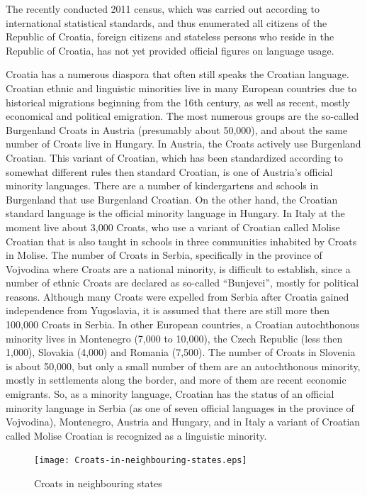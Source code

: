\begin{multicols}{2}
The recently conducted 2011 census, which was carried out according to international statistical standards, and thus enumerated all citizens of the Republic of Croatia, foreign citizens and stateless persons who reside in the Republic of Croatia, has not yet provided official figures on language usage.

Croatia has a numerous diaspora that often still speaks the Croatian language. Croatian ethnic and linguistic minorities live in many European countries due to historical migrations beginning from the 16th century, as well as recent, mostly economical and political emigration. The most numerous groups are the so-called Burgenland Croats in Austria (presumably about 50,000), and about the same number of Croats live in Hungary. In Austria, the Croats actively use Burgenland Croatian. This variant of Croatian, which has been standardized according to somewhat different rules then standard Croatian, is one of Austria’s official minority languages. There are a number of kindergartens and schools in Burgenland that use Burgenland Croatian. On the other hand, the Croatian standard language is the official minority language in Hungary. In Italy at the moment live about 3,000 Croats, who use a variant of Croatian called Molise Croatian that is also taught in schools in three communities inhabited by Croats in Molise. The number of Croats in Serbia, specifically in the province of Vojvodina where Croats are a national minority, is difficult to establish, since a number of ethnic Croats are declared as so-called “Bunjevci”, mostly for political reasons. Although many Croats were expelled from Serbia after Croatia gained independence from Yugoslavia, it is assumed that there are still more then 100,000 Croats in Serbia. In other European countries, a Croatian autochthonous minority lives in Montenegro (7,000 to 10,000), the Czech Republic (less then 1,000), Slovakia (4,000) and Romania (7,500). The number of Croats in Slovenia is about 50,000, but only a small number of them are an autochthonous minority, mostly in settlements along the border, and more of them are recent economic emigrants. So, as a minority language, Croatian has the status of an official minority language in Serbia (as one of seven official languages in the province of Vojvodina), Montenegro, Austria and Hungary, and in Italy a variant of Croatian called Molise Croatian is recognized as a linguistic minority.

\begin{figure}[htb]
  \center
  \texttt{[image: Croats-in-neighbouring-states.eps]}
  \caption{Croats in neighbouring states \cite{boo2}}
  \label{fig:hrvati_en}
\end{figure}


\end{multicols}
